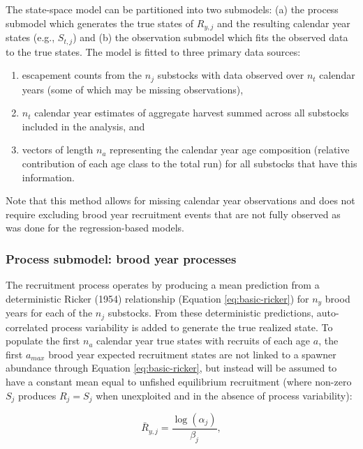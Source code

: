 \documentclass[12pt,]{book}
\theoremstyle{definition}
\theoremstyle{definition}
\theoremstyle{definition}
\theoremstyle{remark}
\begin{document}
The state-space model can be partitioned into two submodels: (a) the
process submodel which generates the true states of \(R_{y,j}\) and the
resulting calendar year states (e.g., \(S_{t,j}\)) and (b) the
observation submodel which fits the observed data to the true states.
The model is fitted to three primary data sources:

\begin{enumerate}
\def\labelenumi{(\arabic{enumi})}
\item
  escapement counts from the \(n_j\) substocks with data observed over
  \(n_t\) calendar years (some of which may be missing observations),
\item
  \(n_t\) calendar year estimates of aggregate harvest summed across all
  substocks included in the analysis, and
\item
  vectors of length \(n_a\) representing the calendar year age
  composition (relative contribution of each age class to the total run)
  for all substocks that have this information.
\end{enumerate}

\noindent
Note that this method allows for missing calendar year observations and
does not require excluding brood year recruitment events that are not
fully observed as was done for the regression-based models.

\subsubsection{Process submodel: brood year
processes}\label{process-submodel-brood-year-processes}

The recruitment process operates by producing a mean prediction from a
deterministic Ricker (1954) relationship (Equation
\eqref{eq:basic-ricker}) for \(n_y\) brood years for each of the \(n_j\)
substocks. From these deterministic predictions, auto-correlated process
variability is added to generate the true realized state. To populate
the first \(n_a\) calendar year true states with recruits of each age
\(a\), the first \(a_{max}\) brood year expected recruitment states are
not linked to a spawner abundance through Equation
\eqref{eq:basic-ricker}, but instead will be assumed to have a constant
mean equal to unfished equilibrium recruitment (where non-zero \(S_j\)
produces \(R_j = S_j\) when unexploited and in the absence of process
variability):

\begin{equation}
  \bar{R}_{y,j}=\frac{\log(\alpha_j)}{\beta_j},
  \label{eq:unfished-R0}
\end{equation}
\end{document}

